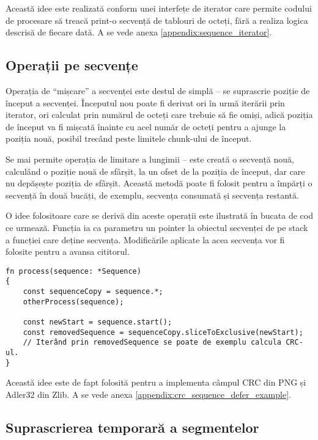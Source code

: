 \documentclass[a4paper,12pt]{report}
\begin{document}

Această idee este realizată conform unei interfețe de iterator care permite codului de procesare
să treacă print-o secvență de tablouri de octeți, fără a realiza logica descrisă de fiecare dată.
A se vede anexa \ref{appendix:sequence_iterator}.

\subsection{Operații pe secvențe}

Operația de ``mișcare'' a secvenței este destul de simplă -- se suprascrie poziție de început a secvenței.
Începutul nou poate fi derivat ori în urmă iterării prin iterator,
ori calculat prin numărul de octeți care trebuie să fie omiși,
adică poziția de început va fi mișcată înainte cu acel număr de octeți
pentru a ajunge la poziția nouă, posibil trecând peste limitele chunk-ului de început.

Se mai permite operația de limitare a lungimii -- este creată o secvență nouă,
calculând o poziție nouă de sfârșit, la un ofset de la poziția de început,
dar care nu depășește poziția de sfârșit.
Această metodă poate fi folosit pentru a împărți o secvență în două bucăți, de exemplu,
secvența consumată și secvența restantă.

O idee folositoare care se derivă din aceste operații este ilustrată în bucata de cod ce urmează.
Funcția ia ca parametru un pointer la obiectul secvenței de pe stack a funcției care deține secvența.
Modificările aplicate la acea secvența vor fi folosite pentru a avansa cititorul.

\begin{verbatim}
fn process(sequence: *Sequence)
{
    const sequenceCopy = sequence.*;
    otherProcess(sequence);

    const newStart = sequence.start();
    const removedSequence = sequenceCopy.sliceToExclusive(newStart);
    // Iterând prin removedSequence se poate de exemplu calcula CRC-ul.
}
\end{verbatim}

Această idee este de fapt folosită pentru a implementa câmpul \ac{CRC} din \ac{PNG} și Adler32 din Zlib.
A se vede anexa \ref{appendix:crc_sequence_defer_example}.

\subsection{Suprascrierea temporară a segmentelor}
\end{document}
